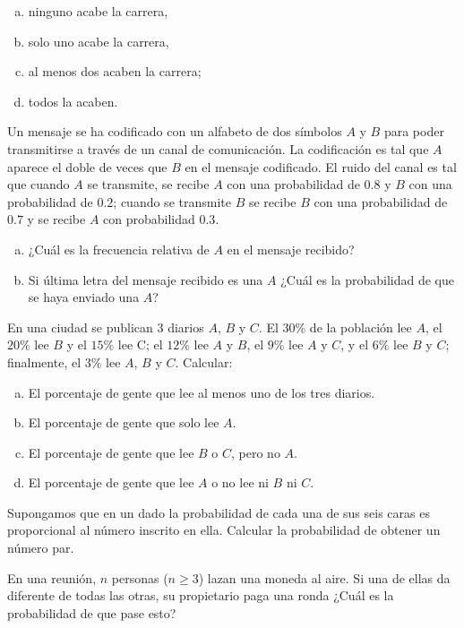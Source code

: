 \documentclass[12pt]{article}
\begin{document}
\begin{enumerate}[a)]
\item  ninguno acabe la carrera,
\item solo uno acabe la carrera,
\item al menos dos acaben la carrera;
\item todos la acaben.
\end{enumerate}

\probl  Un  mensaje se ha codificado con un alfabeto de dos símbolos $A$ y $B$ para poder
transmitirse a través de un canal de comunicación. La codificación es tal que $A$ aparece
el doble de veces que $B$ en el mensaje codificado. El ruido del canal es tal que cuando
$A$ se transmite, se recibe  $A$ con una probabilidad de $0.8$ y  $B$ con una
probabilidad de  $0.2$; cuando se transmite $B$ se recibe  $B$ con una probabilidad de
$0.7$ y se recibe $A$ con probabilidad $0.3$.
\begin{enumerate}[a)]
\item ¿Cuál es la frecuencia relativa de $A$ en el mensaje recibido?
\item Si última letra del mensaje recibido es una $A$ ¿Cuál es la probabilidad de que
 se haya enviado una $A$?
\end{enumerate}

\probl  En una ciudad se publican 3 diarios $A$, $B$ y $C$. El $30
\%$ de la población lee $A$, el $20 \%$ lee $B$ y el $15 \%$ lee
C; el $12 \%$ lee $A$ y $B$, el $9 \%$ lee $A$ y $C$, y el $6 \%$
lee $B$ y $C$; finalmente, el $3 \%$ lee $A$, $B$ y $C$.
Calcular:\
\begin{enumerate}[a)]
\item El porcentaje de gente que lee al menos uno de los tres diarios.
\item El porcentaje de gente que solo lee $A$.
\item  El porcentaje de gente que lee $B$ o $C$, pero no $A$.
\item  El porcentaje de gente que lee $A$ o no lee ni $B$ ni $C$.
\sol{ \bf{ a) 0.41 ; b) 0.12; c) 0.11; d) 0.89}}
\end{enumerate}


 \probl  Supongamos que en un dado la probabilidad de cada una de sus seis
 caras es proporcional al número inscrito en ella. Calcular la probabilidad
de obtener un número par. \sol{\bf 4/7}

\probl  En una reunión, $n$ personas ($n \geq 3$) lazan una moneda
al  aire. Si una de ellas da diferente de todas las otras, su
propietario paga una ronda ¿Cuál es la probabilidad de que pase
esto? 
\end{document}
